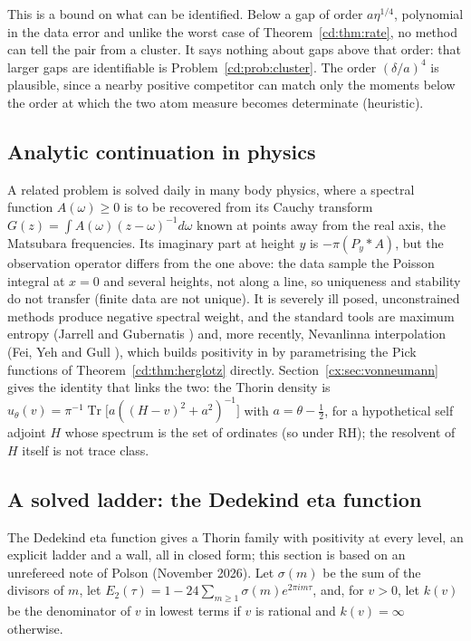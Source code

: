 This is a bound on what can be identified. Below a gap of order $a\eta^{1/4}$, polynomial in the data error and unlike the worst case of Theorem~\ref{cd:thm:rate}, no method can tell the pair from a cluster. It says nothing about gaps above that order: that larger gaps are identifiable is Problem~\ref{cd:prob:cluster}. The order $(\delta/a)^4$ is plausible, since a nearby positive competitor can match only the moments below the order at which the two atom measure becomes determinate (heuristic).

\subsection{Analytic continuation in physics}

A related problem is solved daily in many body physics, where a spectral function $A(\omega)\ge0$ is to be recovered from its Cauchy transform $G(z)=\int A(\omega)(z-\omega)^{-1}d\omega$ known at points away from the real axis, the Matsubara frequencies. Its imaginary part at height $y$ is $-\pi(P_y*A)$, but the observation operator differs from the one above: the data sample the Poisson integral at $x=0$ and several heights, not along a line, so uniqueness and stability do not transfer (finite data are not unique). It is severely ill posed, unconstrained methods produce negative spectral weight, and the standard tools are maximum entropy (Jarrell and Gubernatis \cite{JarrellGubernatis96}) and, more recently, Nevanlinna interpolation (Fei, Yeh and Gull \cite{FeiYehGull21}), which builds positivity in by parametrising the Pick functions of Theorem~\ref{cd:thm:herglotz} directly. Section~\ref{cx:sec:vonneumann} gives the identity that links the two: the Thorin density is $u_\theta(v)=\pi^{-1}\operatorname{Tr}\bigl[a((H-v)^2+a^2)^{-1}\bigr]$ with $a=\theta-\tfrac12$, for a hypothetical self adjoint $H$ whose spectrum is the set of ordinates (so under RH); the resolvent of $H$ itself is not trace class. 

\subsection{A solved ladder: the Dedekind eta function}\label{cd:sec:eta}

The Dedekind eta function gives a Thorin family with positivity at every level, an explicit ladder and a wall, all in closed form; this section is based on an unrefereed note of Polson (November 2026). Let $\sigma(m)$ be the sum of the divisors of $m$, let $E_2(\tau)=1-24\sum_{m\ge1}\sigma(m)e^{2\pi im\tau}$, and, for $v>0$, let $k(v)$ be the denominator of $v$ in lowest terms if $v$ is rational and $k(v)=\infty$ otherwise.

